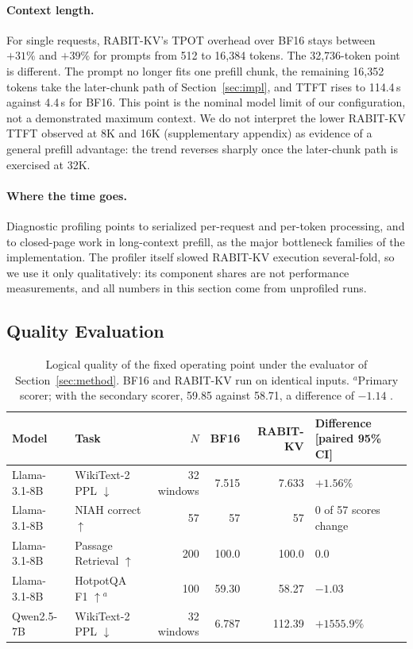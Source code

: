 \documentclass{article}
\begin{document}
\paragraph{Context length.}
For single requests, RABIT-KV's TPOT overhead over BF16 stays between $+31\%$ and $+39\%$ for prompts
from 512 to 16,384 tokens. The 32,736-token point is different. The prompt no longer fits one prefill
chunk, the remaining 16,352 tokens take the later-chunk path of Section~\ref{sec:impl}, and TTFT rises
to 114.4\,s against 4.4\,s for BF16. This point is the nominal model limit of our configuration, not a
demonstrated maximum context. We do not interpret the lower RABIT-KV TTFT observed at 8K and 16K
(supplementary appendix) as evidence of a general prefill advantage: the trend reverses sharply once the later-chunk
path is exercised at 32K.

\paragraph{Where the time goes.}
Diagnostic profiling points to serialized per-request and per-token processing, and to closed-page work
in long-context prefill, as the major bottleneck families of the implementation. The profiler itself
slowed RABIT-KV execution several-fold, so we use it only qualitatively: its component shares are not
performance measurements, and all numbers in this section come from unprofiled runs.

\subsection{Quality Evaluation}
\label{sec:quality}

\begin{table}[t]
\centering
\small
\setlength{\tabcolsep}{5pt}
\begin{tabular}{@{}llrrrl@{}}
\toprule
Model & Task & $N$ & BF16 & RABIT-KV & Difference [paired 95\% CI] \\
\midrule
Llama-3.1-8B & WikiText-2 PPL $\downarrow$ & 32 windows & 7.515 & 7.633 & $+1.56\%$ \;[$+1.12\%$, $+2.05\%$] \\
Llama-3.1-8B & NIAH correct $\uparrow$ & 57 & 57 & 57 & 0 of 57 scores change \\
Llama-3.1-8B & Passage Retrieval $\uparrow$ & 200 & 100.0 & 100.0 & $0.0$ \;[$0.0$, $0.0$] \\
Llama-3.1-8B & HotpotQA F1 $\uparrow$$^{a}$ & 100 & 59.30 & 58.27 & $-1.03$ \;[$-4.24$, $+2.20$] \\
Qwen2.5-7B & WikiText-2 PPL $\downarrow$ & 32 windows & 6.787 & 112.39 & $+1555.9\%$ \;[$+1320\%$, $+1828\%$] \\
\bottomrule
\end{tabular}
\caption{Logical quality of the fixed operating point under the evaluator of Section~\ref{sec:method}.
BF16 and RABIT-KV run on identical inputs. $^{a}$Primary scorer; with the secondary scorer, 59.85
against 58.71, a difference of $-1.14$ \;[$-4.30$, $+2.03$].}
\label{tab:quality}
\end{table}
\end{document}
